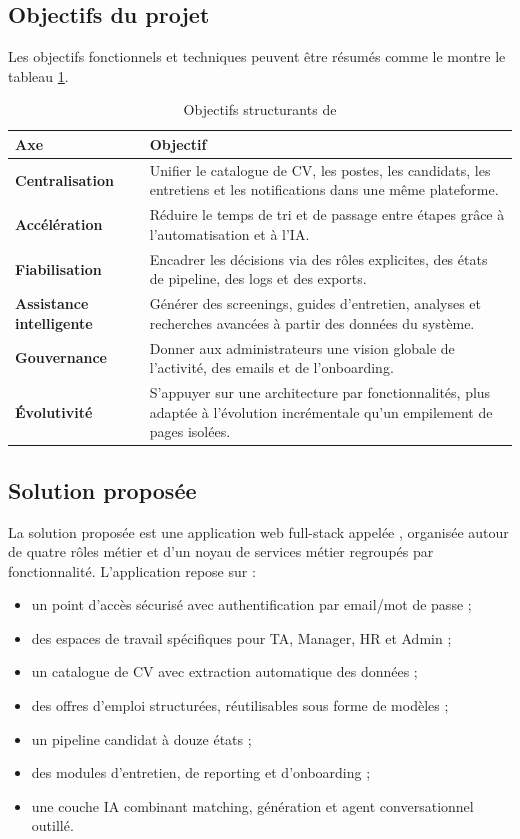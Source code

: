 \subsection{Objectifs du projet}
Les objectifs fonctionnels et techniques peuvent être résumés comme le montre le tableau \ref{tab:project-objectives}.

\begin{table}[H]
  \centering
  \caption{\label{tab:project-objectives}Objectifs structurants de \projectname{}}
  \begin{tabularx}{\textwidth}{>{\bfseries}p{4cm}X}
    \toprule
    Axe & Objectif \\
    \midrule
    Centralisation & Unifier le catalogue de CV, les postes, les candidats, les entretiens et les notifications dans une même plateforme. \\
    Accélération & Réduire le temps de tri et de passage entre étapes grâce à l'automatisation et à l'IA. \\
    Fiabilisation & Encadrer les décisions via des rôles explicites, des états de pipeline, des logs et des exports. \\
    Assistance intelligente & Générer des screenings, guides d'entretien, analyses et recherches avancées à partir des données du système. \\
    Gouvernance & Donner aux administrateurs une vision globale de l'activité, des emails et de l'onboarding. \\
    Évolutivité & S'appuyer sur une architecture par fonctionnalités, plus adaptée à l'évolution incrémentale qu'un empilement de pages isolées. \\
    \bottomrule
  \end{tabularx}
\end{table}

\subsection{Solution proposée}
La solution proposée est une application web full-stack appelée \projectname{}, organisée autour de quatre rôles métier et d'un noyau de services métier regroupés par fonctionnalité. L'application repose sur :
\begin{itemize}
  \item un point d'accès sécurisé avec authentification par email/mot de passe ;
  \item des espaces de travail spécifiques pour TA, Manager, HR et Admin ;
  \item un catalogue de CV avec extraction automatique des données ;
  \item des offres d'emploi structurées, réutilisables sous forme de modèles ;
  \item un pipeline candidat à douze états ;
  \item des modules d'entretien, de reporting et d'onboarding ;
  \item une couche IA combinant matching, génération et agent conversationnel outillé.
\end{itemize}

